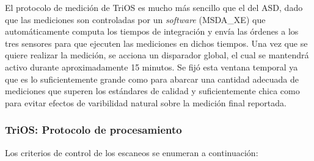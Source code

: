             El protocolo de medición de TriOS es mucho más sencillo que el del ASD, dado que las mediciones son controladas por un \textit{software} (MSDA\_XE) que automáticamente computa los tiempos de integración y envía las órdenes a los tres sensores para que ejecuten las mediciones en dichos tiempos. Una vez que se quiere realizar la medición, se acciona un disparador global, el cual se mantendrá activo durante aproximadamente 15 minutos. Se fijó esta ventana temporal ya que es lo suficientemente grande como para abarcar una cantidad adecuada de mediciones que superen los estándares de calidad y suficientemente chica como para evitar efectos de varibilidad natural sobre la medición final reportada.
    
        \subsubsection{TriOS: Protocolo de procesamiento}
        \label{dat:s:triosProc}
            
            Los criterios de control de los escaneos se enumeran a continuación:

